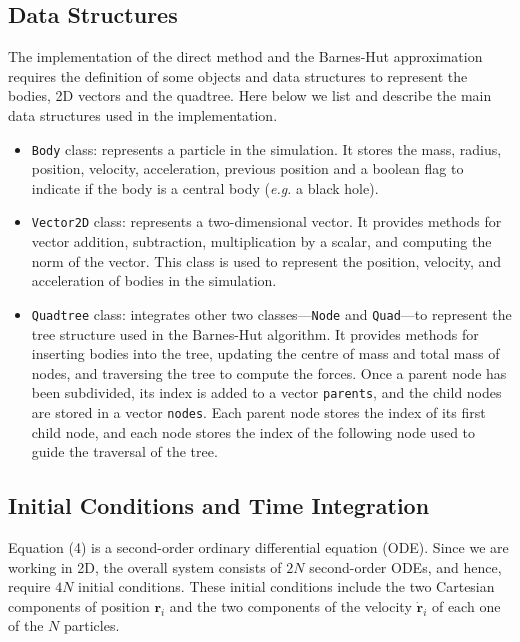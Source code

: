 \documentclass[runningheads]{llncs}
\begin{document}
\subsection{Data Structures}
The implementation of the direct method and the Barnes-Hut approximation requires the definition of some objects and data structures to represent the bodies, 2D vectors and the quadtree. Here below we list and describe the main data structures used in the implementation.
\begin{itemize}
  \item \texttt{Body} class: represents a particle in the simulation. It stores the mass, radius, position, velocity, acceleration, previous position and a boolean flag to indicate if the body is a central body (\emph{e.g.} a black hole).

  \item \texttt{Vector2D} class: represents a two-dimensional vector. It provides methods for vector addition, subtraction, multiplication by a scalar, and computing the norm of the vector. This class is used to represent the position, velocity, and acceleration of bodies in the simulation.

  \item \texttt{Quadtree} class: integrates other two classes---\texttt{Node} and \texttt{Quad}---to represent the tree structure used in the Barnes-Hut algorithm. It provides methods for inserting bodies into the tree, updating the centre of mass and total mass of nodes, and traversing the tree to compute the forces. Once a parent node has been subdivided, its index is added to a vector \texttt{parents}, and the child nodes are stored in a vector \texttt{nodes}.  Each parent node stores the index of its first child node, and each node stores the index of the following node used to guide the traversal of the tree. 
\end{itemize}


\subsection{Initial Conditions and Time Integration}
Equation (4) is a second-order ordinary differential equation (ODE). Since we are working in 2D, the overall system consists of $2N$ second-order ODEs, and hence, require $4N$ initial conditions. These initial conditions include the two Cartesian components of position $\mathbf{r}_i$ and the two components of the velocity $\mathbf{\dot{r}}_i$ of each one of the $N$ particles.
\end{document}
